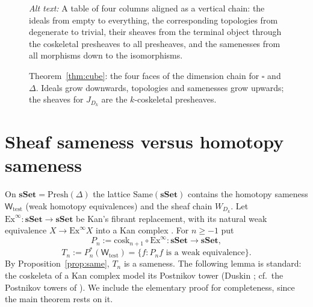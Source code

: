 \documentclass[11pt]{amsart}
\theoremstyle{definition}
\newcommand{\Same}{\mathrm{Same}}
\newcommand{\Mor}{\mathrm{Mor}}
\newcommand{\Iso}{\mathrm{Iso}}
\newcommand{\Presh}{\mathrm{Presh}}
\newcommand{\cosk}{\mathrm{cosk}}
\newcommand{\Wtest}{\mathsf{W}_{\mathrm{test}}}
\newcommand{\sset}{\mathbf{sSet}}
\newcommand{\cube}{\square}
\begin{document}
\begin{figure}[ht]
\centering
{}
\caption{Theorem~\ref{thm:cube}: the four faces of the dimension chain for
$\cube$ and $\Delta$. Ideals grow downwards, topologies and samenesses grow
upwards; the sheaves for $J_{D_k}$ are the $k$-coskeletal presheaves.}
\label{fig:chain}
\par\smallskip\noindent\textit{Alt text:} A table of four columns aligned as
a vertical chain: the ideals from empty to everything, the corresponding
topologies from degenerate to trivial, their sheaves from the terminal object
through the coskeletal presheaves to all presheaves, and the samenesses from
all morphisms down to the isomorphisms.
\end{figure}

\section{Sheaf sameness versus homotopy sameness}\label{sec:join}

On $\sset=\Presh(\Delta)$ the lattice $\Same(\sset)$ contains the homotopy
sameness $\Wtest$ (weak homotopy equivalences) and the sheaf chain $W_{D_k}$.
Let $\mathrm{Ex}^\infty\colon\sset\to\sset$ be Kan's fibrant replacement, with
its natural weak equivalence $X\to\mathrm{Ex}^\infty X$ into a Kan complex
\cite[III.4]{GJ}. For $n\ge-1$ put
\[
P_n:=\cosk_{n+1}\circ\mathrm{Ex}^\infty\colon\sset\to\sset,
\]
\[
T_n:=P_n^*(\Wtest)=\{f: P_nf\text{ is a weak equivalence}\}.
\]
By Proposition~\ref{prop:same}, $T_n$ is a sameness. The following lemma is
standard: the coskeleta of a Kan complex model its Postnikov tower (Duskin
\cite{Duskin}; cf.\ the Postnikov towers of \cite[VI]{GJ}). We include the
elementary proof for completeness, since the main theorem rests on it.
\end{document}
